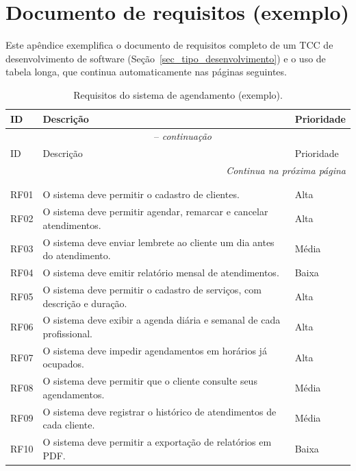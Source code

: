 \chapter{Documento de requisitos (exemplo)}
\label{apB_requisitos}

Este apêndice exemplifica o documento de requisitos completo de um TCC de desenvolvimento de software (Seção~\ref{sec_tipo_desenvolvimento}) e o uso de tabela longa, que continua automaticamente nas páginas seguintes.

{\small
\begin{longtable}{@{}l p{9.5cm} l@{}}
	\caption{Requisitos do sistema de agendamento (exemplo).} \label{tab_requisitos_completos} \\
	\toprule
	ID & Descrição & Prioridade \\
	\midrule
	\endfirsthead
	\multicolumn{3}{c}{\tablename\ \thetable\ -- \textit{continuação}} \\
	\toprule
	ID & Descrição & Prioridade \\
	\midrule
	\endhead
	\midrule
	\multicolumn{3}{r}{\textit{Continua na próxima página}} \\
	\endfoot
	\bottomrule
	\multicolumn{3}{l}{\fontename: Elaborado pelo autor.} \\
	\endlastfoot
	\multicolumn{3}{l}{\textit{Requisitos funcionais}} \\
	RF01 & O sistema deve permitir o cadastro de clientes. & Alta \\
	RF02 & O sistema deve permitir agendar, remarcar e cancelar atendimentos. & Alta \\
	RF03 & O sistema deve enviar lembrete ao cliente um dia antes do atendimento. & Média \\
	RF04 & O sistema deve emitir relatório mensal de atendimentos. & Baixa \\
	RF05 & O sistema deve permitir o cadastro de serviços, com descrição e duração. & Alta \\
	RF06 & O sistema deve exibir a agenda diária e semanal de cada profissional. & Alta \\
	RF07 & O sistema deve impedir agendamentos em horários já ocupados. & Alta \\
	RF08 & O sistema deve permitir que o cliente consulte seus agendamentos. & Média \\
	RF09 & O sistema deve registrar o histórico de atendimentos de cada cliente. & Média \\
	RF10 & O sistema deve permitir a exportação de relatórios em PDF. & Baixa \\

\end{longtable}}
